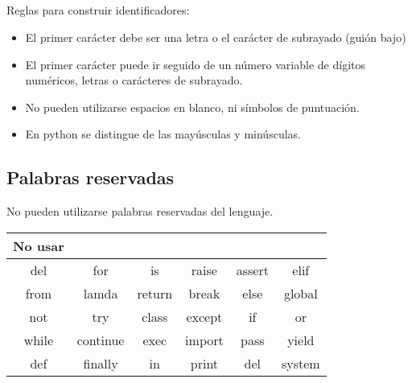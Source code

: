\documentclass[]{article}
\providecommand{\tightlist}{%
  \setlength{\itemsep}{0pt}\setlength{\parskip}{0pt}}
\begin{document}
\subsection{}\label{section-41}

Reglas para construir identificadores:

\begin{itemize}
\tightlist
\item
  El primer carácter debe ser una letra o el carácter de subrayado
  (guión bajo)
\item
  El primer carácter puede ir seguido de un número variable de dígitos
  numéricos, letras o carácteres de subrayado.
\item
  No pueden utilizarse espacios en blanco, ni símbolos de puntuación.
\item
  En python se distingue de las mayúsculas y minúsculas.
\end{itemize}

\subsection{Palabras reservadas}\label{palabras-reservadas}

No pueden utilizarse palabras reservadas del lenguaje.

\begin{longtable}[]{@{}cccccc@{}}
\toprule
No usar &\tabularnewline
\midrule
\endhead
del & for & is & raise & assert & elif\tabularnewline
from & lamda & return & break & else & global\tabularnewline
not & try & class & except & if & or\tabularnewline
while & continue & exec & import & pass & yield\tabularnewline
def & finally & in & print & del & system\tabularnewline
\bottomrule
\end{longtable}
\end{document}
